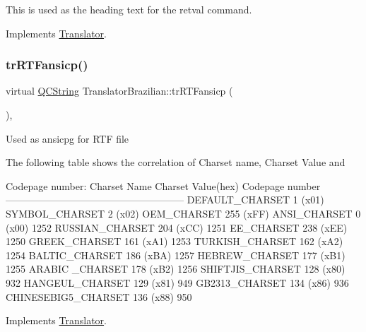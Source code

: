 This is used as the heading text for the retval command. 

Implements \mbox{\hyperlink{class_translator}{Translator}}.

\mbox{\label{class_translator_brazilian_aeaeb16bc0bff2e8c053a3746892711d4}} 
\subsubsection{\texorpdfstring{trRTFansicp()}{trRTFansicp()}}
{\footnotesize\ttfamily virtual \mbox{\hyperlink{class_q_c_string}{Q\+C\+String}} Translator\+Brazilian\+::tr\+R\+T\+Fansicp (\begin{DoxyParamCaption}{ }\end{DoxyParamCaption})\hspace{0.3cm}{\ttfamily [inline]}, {\ttfamily [virtual]}}

Used as ansicpg for R\+TF file

The following table shows the correlation of Charset name, Charset Value and 
\begin{DoxyPre}
Codepage number:
Charset Name       Charset Value(hex)  Codepage number
------------------------------------------------------
DEFAULT\_CHARSET           1 (x01)
SYMBOL\_CHARSET            2 (x02)
OEM\_CHARSET             255 (xFF)
ANSI\_CHARSET              0 (x00)            1252
RUSSIAN\_CHARSET         204 (xCC)            1251
EE\_CHARSET              238 (xEE)            1250
GREEK\_CHARSET           161 (xA1)            1253
TURKISH\_CHARSET         162 (xA2)            1254
BALTIC\_CHARSET          186 (xBA)            1257
HEBREW\_CHARSET          177 (xB1)            1255
ARABIC \_CHARSET         178 (xB2)            1256
SHIFTJIS\_CHARSET        128 (x80)             932
HANGEUL\_CHARSET         129 (x81)             949
GB2313\_CHARSET          134 (x86)             936
CHINESEBIG5\_CHARSET     136 (x88)             950
\end{DoxyPre}
 

Implements \mbox{\hyperlink{class_translator_a9953a4c0e6a4fc7d017abcd5c2939e0f}{Translator}}.

\mbox{\label{class_translator_brazilian_a335fe7cb6b7b78d11ff37386d85b7efd}} 
